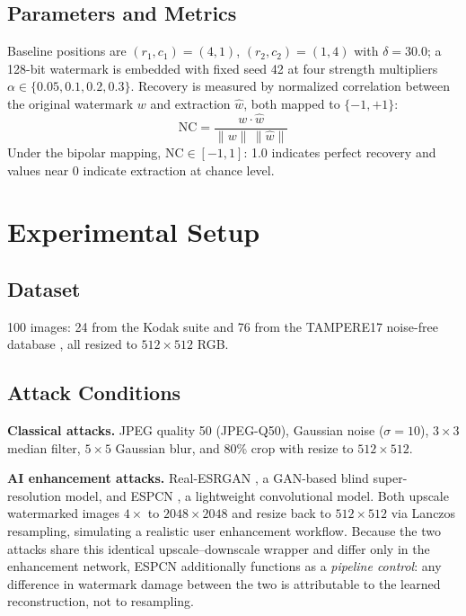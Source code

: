 \documentclass[conference]{IEEEtran}
\begin{document}
\subsection{Parameters and Metrics}
Baseline positions are $(r_1,c_1)=(4,1)$, $(r_2,c_2)=(1,4)$ with
$\delta=30.0$; a 128-bit watermark is embedded with fixed seed 42 at
four strength multipliers $\alpha \in \{0.05, 0.1, 0.2, 0.3\}$.
Recovery is measured by normalized correlation between the original
watermark $w$ and extraction $\hat{w}$, both mapped to $\{-1,+1\}$:
\begin{equation}
\mathrm{NC} = \frac{w \cdot \hat{w}}{\lVert w \rVert\, \lVert \hat{w} \rVert}
\end{equation}
Under the bipolar mapping, $\mathrm{NC} \in [-1,1]$: 1.0 indicates
perfect recovery and values near 0 indicate extraction at chance
level.

\section{Experimental Setup}
\label{sec:setup}

\subsection{Dataset}
100 images: 24 from the Kodak suite \cite{kodak} and 76 from the
TAMPERE17 noise-free database \cite{tampere17}, all resized to
$512\times512$ RGB.

\subsection{Attack Conditions}
\textbf{Classical attacks.} JPEG quality 50 (JPEG-Q50), Gaussian noise
($\sigma=10$), $3\times3$ median filter, $5\times5$ Gaussian blur, and
80\% crop with resize to $512\times512$.

\textbf{AI enhancement attacks.} Real-ESRGAN \cite{realesrgan2021}, a
GAN-based blind super-resolution model, and ESPCN \cite{espcn2016}, a
lightweight convolutional model. Both upscale watermarked images
$4\times$ to $2048\times2048$ and resize back to $512\times512$ via
Lanczos resampling, simulating a realistic user enhancement workflow.
Because the two attacks share this identical upscale--downscale
wrapper and differ only in the enhancement network, ESPCN additionally
functions as a \emph{pipeline control}: any difference in watermark
damage between the two is attributable to the learned reconstruction,
not to resampling.
\end{document}
